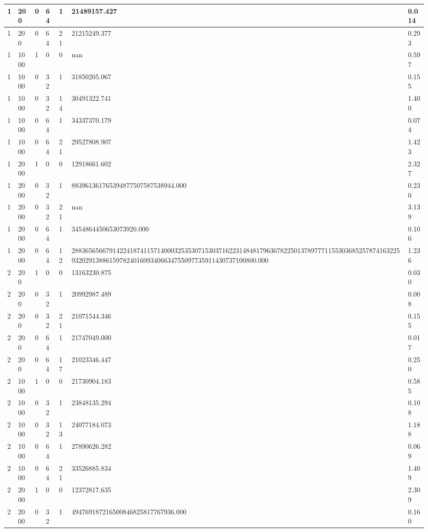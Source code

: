 \begin{table}[!ht]
{\begin{tabular}{|l|l|l|l|l|l|l|}
        1 & 200 & 0 & 64 & 1 & 21489157.427 & 0.014 \\ \hline
        1 & 200 & 0 & 64 & 21 & 21215249.377 & 0.293 \\ \hline
        1 & 1000 & 1 & 0 & 0 & nan & 0.597 \\ \hline
        1 & 1000 & 0 & 32 & 1 & 31850205.067 & 0.155 \\ \hline
        1 & 1000 & 0 & 32 & 14 & 30491322.741 & 1.400 \\ \hline
        1 & 1000 & 0 & 64 & 1 & 34337370.179 & 0.074 \\ \hline
        1 & 1000 & 0 & 64 & 21 & 29527808.907 & 1.423 \\ \hline
        1 & 2000 & 1 & 0 & 0 & 12918661.602 & 2.327 \\ \hline
        1 & 2000 & 0 & 32 & 1 & 883961361765394877507587538944.000 & 0.230 \\ \hline
        1 & 2000 & 0 & 32 & 21 & nan & 3.139 \\ \hline
        1 & 2000 & 0 & 64 & 1 & 3454864450653073920.000 & 0.106 \\ \hline
        1 & 2000 & 0 & 64 & 12 & 288365656679142241874115714000325353071530371622314848179636782250137897771155303685257874163225932029138861597824016093406634755097735911430737100800.000 & 1.236 \\ \hline
        2 & 200 & 1 & 0 & 0 & 13163230.875 & 0.030 \\ \hline
        2 & 200 & 0 & 32 & 1 & 20992987.489 & 0.008 \\ \hline
        2 & 200 & 0 & 32 & 21 & 21071544.346 & 0.155 \\ \hline
        2 & 200 & 0 & 64 & 1 & 21747049.000 & 0.017 \\ \hline
        2 & 200 & 0 & 64 & 17 & 21023346.447 & 0.250 \\ \hline
        2 & 1000 & 1 & 0 & 0 & 21730904.183 & 0.585 \\ \hline
        2 & 1000 & 0 & 32 & 1 & 23848135.294 & 0.108 \\ \hline
        2 & 1000 & 0 & 32 & 13 & 24077184.073 & 1.188 \\ \hline
        2 & 1000 & 0 & 64 & 1 & 27890626.282 & 0.069 \\ \hline
        2 & 1000 & 0 & 64 & 21 & 33526885.834 & 1.409 \\ \hline
        2 & 2000 & 1 & 0 & 0 & 12372817.635 & 2.309 \\ \hline
        2 & 2000 & 0 & 32 & 1 & 494769187216500846825817767936.000 & 0.160 \\ \hline

\end{tabular}}
\end{table}

